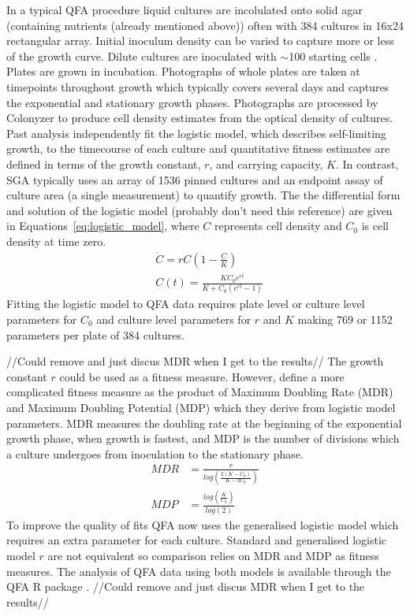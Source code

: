 In a typical QFA procedure liquid cultures are incolulated onto solid
agar (containing nutrients (already mentioned above)) often with 384
cultures in 16x24 rectangular array. Initial inoculum density can be
varied to capture more or less of the growth curve. Dilute cultures
are inoculated with \(\sim\)100 starting cells
\citep{Addinall2011}. Plates are grown in incubation. Photographs of
whole plates are taken at timepoints throughout growth which typically
covers several days and captures the exponential and stationary growth
phases. Photographs are processed by Colonyzer \citep{Lawless2010} to
produce cell density estimates from the optical density of
cultures. Past analysis independently fit the logistic model, which
describes self-limiting growth, to the timecourse of each culture and
quantitative fitness estimates are defined in terms of the growth
constant, \(r\), and carrying capacity, \(K\). In contrast, SGA
typically uses an array of 1536 pinned cultures and an endpoint assay
of culture area (a single measurement) to quantify growth. The the
differential form and solution of the logistic model
\citep{Verhulst1845} (probably don't need this reference) are given in
Equations~\ref{eq:logistic_model}, where \(C\) represents cell density
and \(C_0\) is cell density at time zero.
\begin{subequations}
  \label{eq:logistic_model}
  \begin{align}
    &\dot{C} = rC\left(1 - \frac{C}{K}\right)\\
    &C(t) = \frac{KC_{0}e^{rt}}{K + C_{0}(e^{rt}-1)}
  \end{align}
\end{subequations}
%
Fitting the logistic model to QFA data requires plate level or culture
level parameters for \(C_{0}\) and culture level parameters for \(r\)
and \(K\) making 769 or 1152 parameters per plate of 384 cultures.

//Could remove and just discus MDR when I get to the results//
The growth constant \(r\) could be used as a fitness measure. However,
\citet{Addinall2011} define a more complicated fitness measure as the
product of Maximum Doubling Rate (MDR) and Maximum Doubling Potential
(MDP) which they derive from logistic model parameters. MDR measures
the doubling rate at the beginning of the exponential growth phase,
when growth is fastest, and MDP is the number of divisions which a
culture undergoes from inoculation to the stationary phase.
%
\begin{subequations}
  \label{eq:MDR_MDP}
    \begin{align}
      MDR &= \frac{r}{log\left(\frac{2(K-C_0)}{K-2C_0}\right)}\\
      MDP &= \frac{log\left(\frac{K}{C_0}\right)}{log(2)}
    \end{align}
\end{subequations}
%
To improve the quality of fits QFA now uses the generalised logistic
model which requires an extra parameter for each culture. Standard and
generalised logistic model \(r\) are not equivalent so comparison
relies on MDR and MDP as fitness measures. The analysis of QFA data
using both models is available through the QFA R package
\citep{qfa2016}.
//Could remove and just discus MDR when I get to the results//


